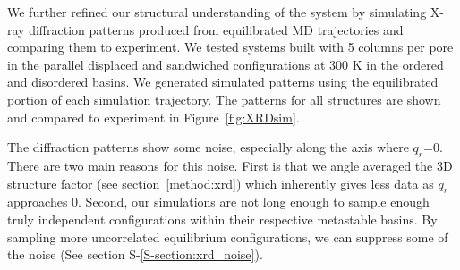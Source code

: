 \documentclass[journal=jpcbfk,manuscript=article]{achemso}
\begin{document}
  We further refined our structural understanding of the system by simulating X-ray 
  diffraction patterns produced from equilibrated MD trajectories and comparing them
  to experiment. We tested systems built with 5 columns per pore in the parallel 
  displaced and sandwiched configurations at 300 K in the ordered and disordered
  basins. We generated simulated patterns using the equilibrated portion of each 
  simulation trajectory. The patterns for all structures are shown and compared to
  experiment in Figure~\ref{fig:XRDsim}.
  
  The diffraction patterns show some noise, especially along the axis where $q_r$=0. There are
  two main reasons for this noise. First is that we angle averaged the 3D structure factor 
  (see section~\ref{method:xrd}) which inherently gives less data as $q_r$ approaches 0. Second, 
  our simulations are not long enough to sample enough truly independent configurations within
  their respective metastable basins. By sampling more uncorrelated equilibrium configurations,
  we can suppress some of the noise (See section S-\ref{S-section:xrd_noise}).
\end{document}

